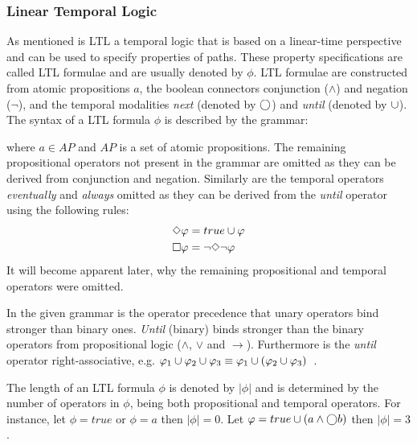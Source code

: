\subsubsection{Linear Temporal Logic}
\label{sec:ltl}
As mentioned is LTL a temporal logic that is based on a linear-time perspective and can be used to specify properties of paths. These property specifications are called LTL formulae and are usually denoted by $\phi$. LTL formulae are constructed from atomic propositions $a$, the boolean connectors conjunction ($\land$) and negation ($\lnot$), and the temporal modalities \emph{next} (denoted by $\bigcirc$) and \emph{until} (denoted by $\cup$). The syntax of a LTL formula $\phi$ is described by the grammar:

where $a \in AP$ and $AP$ is a set of atomic propositions. The remaining propositional operators not present in the grammar are omitted as they can be derived from conjunction and negation. Similarly are the temporal operators \emph{eventually} and \emph{always} omitted as they can be derived from the \emph{until} operator using the following rules:
\begin{align}
    &\Diamond \varphi = true \cup \varphi \label{eq:eventually} \\
    &\square \varphi = \lnot \Diamond \lnot \varphi \label{eq:always}
\end{align}
It will become apparent later, why the remaining propositional and temporal operators were omitted.

In the given grammar is the operator precedence that unary operators bind stronger than binary ones. \emph{Until} (binary) binds stronger than the binary operators from propositional logic ($\land$, $\lor$ and $\to$). Furthermore is the \emph{until} operator right-associative, e.g. $\varphi_1 \cup \varphi_2 \cup \varphi_3 \equiv \varphi_1 \cup \left(\varphi_2 \cup \varphi_3\right)$~\cite{baier2008principles}.

The length of an LTL formula $\phi$ is denoted by $| \phi |$ and is determined by the number of operators in $\phi$, being both propositional and temporal operators. For instance, let $\phi= true$ or $\phi= a$ then $| \phi | = 0$. Let $\varphi= true \cup \left( a \land \bigcirc b \right)$ then $| \phi | = 3$.

